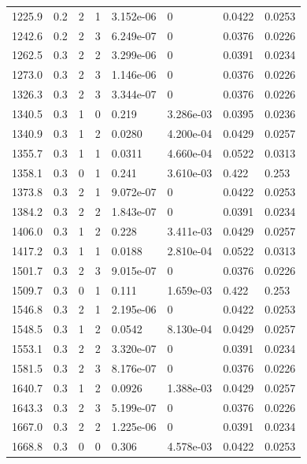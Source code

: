 \documentclass[preview]{standalone}
\begin{document}
{{{\begin{tabular}{L{1.2cm}C{1.2cm} C{0.3cm}C{0.5cm} C{1.4cm}C{1.4cm} C{1.4cm}C{1.4cm}}
  1225.9  &   0.2  & 2     &  1 &  3.152e-06  & 0  & 0.0422 &  0.0253   \\ 
  1242.6  &   0.2  & 2     &  3 &  6.249e-07  & 0  & 0.0376 &  0.0226   \\ 
  1262.5  &   0.3  & 2     &  2 &  3.299e-06  & 0  & 0.0391 &  0.0234   \\ 
  1273.0  &   0.3  & 2     &  3 &  1.146e-06  & 0  & 0.0376 &  0.0226   \\ 
  1326.3  &   0.3  & 2     &  3 &  3.344e-07  & 0  & 0.0376 &  0.0226   \\ 
  1340.5  &   0.3  & 1     &  0 &  0.219  & 3.286e-03  & 0.0395 &  0.0236   \\ 
  1340.9  &   0.3  & 1     &  2 &  0.0280  & 4.200e-04  & 0.0429 &  0.0257   \\ 
  1355.7  &   0.3  & 1     &  1 &  0.0311  & 4.660e-04  & 0.0522 &  0.0313   \\ 
  1358.1  &   0.3  & 0     &  1 &  0.241  & 3.610e-03  & 0.422 &  0.253   \\ 
  1373.8  &   0.3  & 2     &  1 &  9.072e-07  & 0  & 0.0422 &  0.0253   \\ 
  1384.2  &   0.3  & 2     &  2 &  1.843e-07  & 0  & 0.0391 &  0.0234   \\ 
  1406.0  &   0.3  & 1     &  2 &  0.228  & 3.411e-03  & 0.0429 &  0.0257   \\ 
  1417.2  &   0.3  & 1     &  1 &  0.0188  & 2.810e-04  & 0.0522 &  0.0313   \\ 
  1501.7  &   0.3  & 2     &  3 &  9.015e-07  & 0  & 0.0376 &  0.0226   \\ 
  1509.7  &   0.3  & 0     &  1 &  0.111  & 1.659e-03  & 0.422 &  0.253   \\ 
  1546.8  &   0.3  & 2     &  1 &  2.195e-06  & 0  & 0.0422 &  0.0253   \\ 
  1548.5  &   0.3  & 1     &  2 &  0.0542  & 8.130e-04  & 0.0429 &  0.0257   \\ 
  1553.1  &   0.3  & 2     &  2 &  3.320e-07  & 0  & 0.0391 &  0.0234   \\ 
  1581.5  &   0.3  & 2     &  3 &  8.176e-07  & 0  & 0.0376 &  0.0226   \\ 
  1640.7  &   0.3  & 1     &  2 &  0.0926  & 1.388e-03  & 0.0429 &  0.0257   \\ 
  1643.3  &   0.3  & 2     &  3 &  5.199e-07  & 0  & 0.0376 &  0.0226   \\ 
  1667.0  &   0.3  & 2     &  2 &  1.225e-06  & 0  & 0.0391 &  0.0234   \\ 
  1668.8  &   0.3  & 0     &  0 &  0.306  & 4.578e-03  & 0.0422 &  0.0253   \\ 

\end{tabular}}}}
\end{document}
